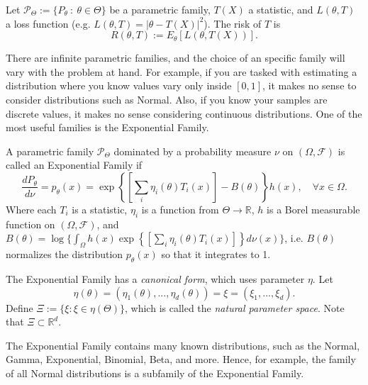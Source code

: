 \begin{definition}[Risk]
	Let
	$\mathcal P_\Theta := \{P_\theta \ : \ \theta \in \Theta \}$ be a parametric family,
	$T(X)$ a statistic, and $L(\theta, T)$ a loss function (e.g. $L(\theta, T) = |\theta - T(X)|^2$).
	The risk of $T$ is
	\begin{equation}
		R(\theta,T) := E_\theta[L(\theta,T(X))].
	\end{equation}
\end{definition}


There are infinite parametric families, and the choice of an specific family will
vary with the problem at hand. For example, if you are tasked with estimating a
distribution where you know values vary only inside $[0,1]$, it makes no sense
to consider distributions such as Normal. Also, if you know your samples are
discrete values, it makes no sense considering continuous distributions.
One of the most useful families is the Exponential Family.

\begin{definition}
	A parametric family $\mathcal P_\Theta$ dominated by a probability measure $\nu$ on
	$(\Omega, \mathcal F)$ is called an Exponential Family if
	\begin{equation}
		\frac{d P_\theta}{d\nu} = p_\theta(x) =
		\exp\left\{
		\left[\sum_i \eta_i(\theta)T_i(x)\right] - B(\theta)
		\right\} h(x),\quad \forall x \in \Omega.
		\label{expfamily}
	\end{equation}
	Where each $T_i$ is a statistic, $\eta_i$ is a function from $\Theta \to \mathbb R$,
	$h$ is a Borel measurable function on $(\Omega, \mathcal F)$, and
	$B(\theta) = \log \{ \int_\Omega h(x)\exp\left\{\left[\sum_i \eta_i(\theta)T_i(x)\right]\right\}
		d\nu(x)
		\}$, i.e. $B(\theta)$ normalizes the distribution $p_\theta(x)$ so that it integrates to 1.

	The Exponential Family has a \textit{canonical form}, which uses parameter $\eta$.
	Let
	\begin{equation}
		\eta(\theta) = (\eta_1(\theta),...,\eta_d(\theta)) = \xi = (\xi_1,...,\xi_d).
	\end{equation}
	Define $\Xi := \{\xi :\xi \in \eta(\Theta)\}$, which is called the \textit{natural parameter space}.
	Note that $\Xi \subset \mathbb R^d$.
\end{definition}

The Exponential Family contains many known distributions, such as the Normal,
Gamma, Exponential, Binomial, Beta, and more. Hence, for example, the family of all
Normal distributions is a subfamily of the Exponential Family.

